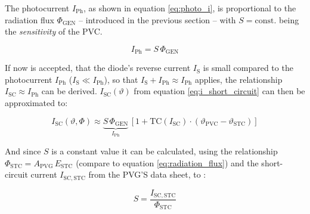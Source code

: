 The photocurrent $I_{\mathrm{Ph}}$, as shown in equation \ref{eq:photo_i}, is proportional to the radiation flux $\Phi_{\mathrm{GEN}}$ -- introduced in the previous section -- with $S = \mathrm{const.}$ being the \emph{sensitivity} of the PVC.
\begin{center}
	\begin{equation} \label{eq:photo_i}
		 I_{\mathrm{Ph}} = S \, \Phi_{\mathrm{GEN}} 
	\end{equation}
\end{center}
If now is accepted, that the diode's reverse current $I_{\mathrm{S}}$ is small compared to the photocurrent $I_{\mathrm{Ph}}$ ($I_{\mathrm{S}} \ll I_{\mathrm{Ph}}$), so that $I_{\mathrm{S}} + I_{\mathrm{Ph}} \approx I_{\mathrm{Ph}}$ applies, the relationship $I_{\mathrm{SC}} \approx I_{\mathrm{Ph}}$ can be derived. $I_{\mathrm{SC}}\left(\vartheta\right)$ from equation \ref{eq:i_short_circuit} can then be approximated to:
\begin{center}
	\begin{equation} \label{eq:i_short_circuit_phi_gen}
		I_{\mathrm{SC}}\left(\vartheta,\Phi\right) \approx \underbrace{S \, \Phi_{\mathrm{GEN}}}_{I_\mathrm{Ph}} \, \left[ 1 + \mathrm{TC}\left(I_{\mathrm{SC}}\right) \cdot \left(\vartheta_{\mathrm{PVC}} - \vartheta_{\mathrm{STC}} \right) \right]
	\end{equation}
\end{center}
And since $S$ is a constant value it can be calculated, using the relationship $\Phi_{\mathrm{STC}} = A_{\mathrm{PVG}} \, E_{\mathrm{STC}}$ (compare to equation \ref{eq:radiation_flux}) and the short-circuit current $I_{\mathrm{SC,STC}}$ from the PVG'S data sheet, to \cite{Mertens:2015}:
\begin{center}
	\begin{equation} \label{eq:sensitivity}
		S = \frac{I_{\mathrm{SC,STC}}}{\Phi_{\mathrm{STC}}}
	\end{equation}
\end{center}

